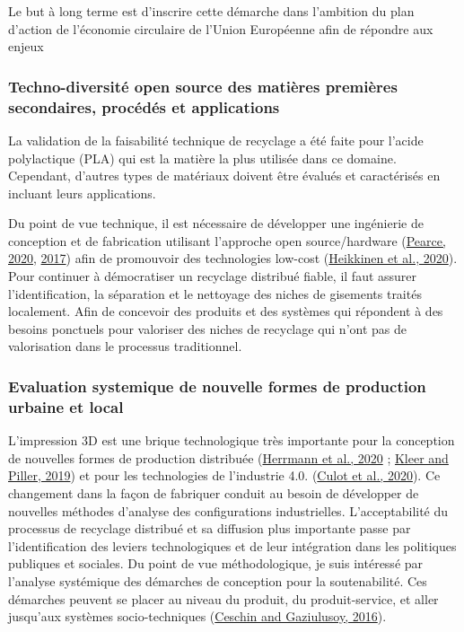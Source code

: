 \documentclass[
  11pt,
]{article}
\begin{document}
Le but à long terme est d'inscrire cette démarche dans l'ambition du
plan d'action de l'économie circulaire de l'Union Européenne afin de
répondre aux enjeux

\hypertarget{techno-diversituxe9-open-source-des-matiuxe8res-premiuxe8res-secondaires-procuxe9duxe9s-et-applications}{%
\subsubsection{Techno-diversité open source des matières premières
secondaires, procédés et
applications}\label{techno-diversituxe9-open-source-des-matiuxe8res-premiuxe8res-secondaires-procuxe9duxe9s-et-applications}}

La validation de la faisabilité technique de recyclage a été faite pour
l'acide polylactique (PLA) qui est la matière la plus utilisée dans ce
domaine. Cependant, d'autres types de matériaux doivent être évalués et
caractérisés en incluant leurs applications.

Du point de vue technique, il est nécessaire de développer une
ingénierie de conception et de fabrication utilisant l'approche open
source/hardware (\protect\hyperlink{ref-Pearce2020a}{Pearce, 2020},
\protect\hyperlink{ref-Pearce2017b}{2017}) afin de promouvoir des
technologies low-cost (\protect\hyperlink{ref-Heikkinen2020a}{Heikkinen
et al., 2020}). Pour continuer à démocratiser un recyclage distribué
fiable, il faut assurer l'identification, la séparation et le nettoyage
des niches de gisements traités localement. Afin de concevoir des
produits et des systèmes qui répondent à des besoins ponctuels pour
valoriser des niches de recyclage qui n'ont pas de valorisation dans le
processus traditionnel.

\hypertarget{evaluation-systemique-de-nouvelle-formes-de-production-urbaine-et-local}{%
\subsubsection{Evaluation systemique de nouvelle formes de production
urbaine et
local}\label{evaluation-systemique-de-nouvelle-formes-de-production-urbaine-et-local}}

L'impression 3D est une brique technologique très importante pour la
conception de nouvelles formes de production distribuée
(\protect\hyperlink{ref-Herrmann2020}{Herrmann et al., 2020} ;
\protect\hyperlink{ref-Kleer2019}{Kleer and Piller, 2019}) et pour les
technologies de l'industrie 4.0.
(\protect\hyperlink{ref-Culot2020}{Culot et al., 2020}). Ce changement
dans la façon de fabriquer conduit au besoin de développer de nouvelles
méthodes d'analyse des configurations industrielles. L'acceptabilité du
processus de recyclage distribué et sa diffusion plus importante passe
par l'identification des leviers technologiques et de leur intégration
dans les politiques publiques et sociales. Du point de vue
méthodologique, je suis intéressé par l'analyse systémique des démarches
de conception pour la soutenabilité. Ces démarches peuvent se placer au
niveau du produit, du produit-service, et aller jusqu'aux systèmes
socio-techniques (\protect\hyperlink{ref-Ceschin2016}{Ceschin and
Gaziulusoy, 2016}).
\end{document}
